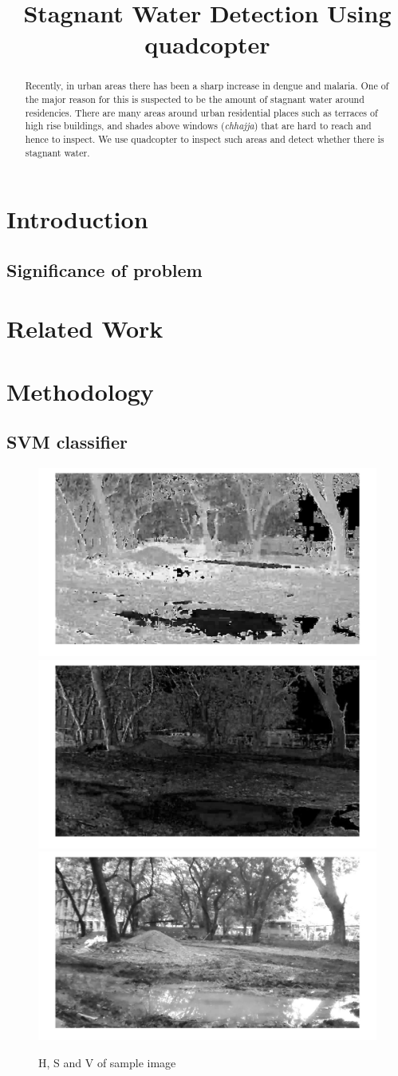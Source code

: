\documentclass[times,10pt,twocolumn,a4paper]{article}
\title{Stagnant Water Detection Using quadcopter}
\author{}
\begin{document}
\maketitle

\begin{abstract}
Recently, in urban areas there has been a sharp increase in dengue and malaria.
One of the major reason for this is suspected to be the amount of stagnant
water around residencies. There are many areas around urban residential places
such as terraces of high rise buildings, and shades above windows
(\emph{chhajja}) that are hard to reach and hence to inspect. We use quadcopter
to inspect such areas and detect whether there is stagnant water.

\end{abstract}

\section{Introduction}

\subsection{Significance of problem}
\cite{WHO15Malaria} \cite{Cecilia14} \cite{WHO15Dengue} \cite{Microsoft15}

\section{Related Work}

\cite{rankin11}\cite{santana12}\cite{zhang10}

\section{Methodology}

\subsection{SVM classifier}


\begin{figure}[h!]
\centering
\includegraphics[width=0.3\linewidth]{images/IMG_PAIR_1_1_H.jpg}
\includegraphics[width=0.3\linewidth]{images/IMG_PAIR_1_1_S.jpg}
\includegraphics[width=0.3\linewidth]{images/IMG_PAIR_1_1_V.jpg}
\caption{H, S and V of sample image}
\label{fig:HSV}
\end{figure}
\end{document}
